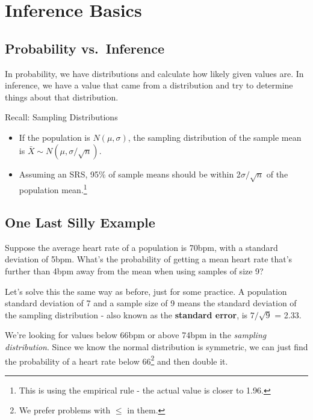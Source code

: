 \documentclass[
  letterpaper,
  DIV=11,
  numbers=noendperiod,
  oneside]{scrreprt}
\providecommand{\tightlist}{%
  \setlength{\itemsep}{0pt}\setlength{\parskip}{0pt}}\usepackage{longtable,booktabs,array}
\begin{document}
\hypertarget{inference-basics}{%
\section{Inference Basics}\label{inference-basics}}

\hypertarget{probability-vs.-inference}{%
\subsection{Probability vs.~Inference}\label{probability-vs.-inference}}

In probability, we have distributions and calculate how likely given
values are. In inference, we have a value that came from a distribution
and try to determine things about that distribution.

Recall: Sampling Distributions

\begin{itemize}
\tightlist
\item
  If the population is \(N(\mu,\sigma)\), the sampling distribution of
  the sample mean is \(\bar X\sim N(\mu,\sigma/\sqrt{n})\).
\item
  Assuming an SRS, 95\% of sample means should be within
  2\(\sigma/\sqrt{n}\) of the population mean.\footnote{This is using
    the empirical rule - the actual value is closer to 1.96.}
\end{itemize}

\hypertarget{one-last-silly-example}{%
\subsection{One Last Silly Example}\label{one-last-silly-example}}

Suppose the average heart rate of a population is 70bpm, with a standard
deviation of 5bpm. What's the probability of getting a mean heart rate
that's further than 4bpm away from the mean when using samples of size
9?

Let's solve this the same way as before, just for some practice. A
population standard deviation of 7 and a sample size of 9 means the
standard deviation of the sampling distribution - also known as the
\textbf{standard error}, is \(7/\sqrt{9}\) = 2.33.

We're looking for values below 66bpm or above 74bpm in the
\emph{sampling distribution}. Since we know the normal distribution is
symmetric, we can just find the probability of a heart rate below
66\footnote{We prefer problems with \(\le\) in them.} and then double
it.
\end{document}
